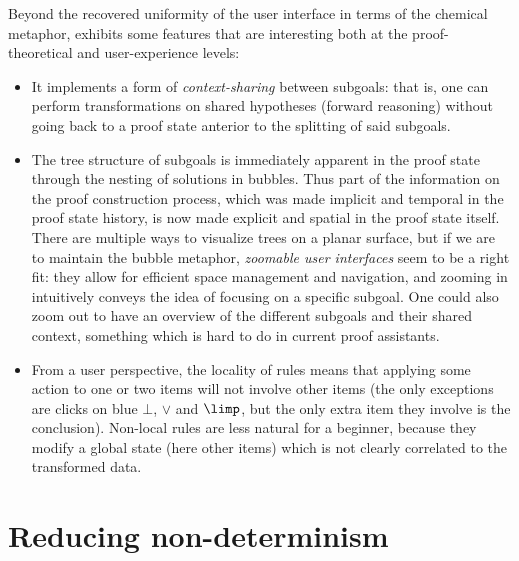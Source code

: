 Beyond the recovered uniformity of the user interface in terms of the chemical
metaphor,  exhibits some features that are interesting both at the
proof-theoretical and user-experience levels:
\begin{itemize}
  \item It implements a form of \emph{context-sharing} between subgoals: that
    is, one can perform transformations on shared hypotheses (forward reasoning)
    without going back to a proof state anterior to the splitting of said
    subgoals.
  \item The tree structure of subgoals is immediately apparent in the proof
    state through the nesting of solutions in bubbles. Thus part of the
    information on the proof construction process, which was made implicit and
    temporal in the proof state history, is now made explicit and spatial in the
    proof state itself. There are multiple ways to visualize trees on a planar
    surface, but if we are to maintain the bubble metaphor, \emph{zoomable user
    interfaces} seem to be a right fit: they allow for efficient space
    management and navigation, and zooming in intuitively conveys the idea of
    focusing on a specific subgoal. One could also zoom out to have an overview
    of the different subgoals and their shared context, something which is hard
    to do in current proof assistants.
  \item From a user perspective, the locality of rules means that applying some
    action to one or two items will not involve other items (the only exceptions
    are clicks on blue $\bot$, $\lor$ and ${\limp}$, but the only extra item
    they involve is the conclusion). Non-local rules are less natural for a
    beginner, because they modify a global state (here other items) which is not
    clearly correlated to the transformed data.
\end{itemize}

\section{Reducing non-determinism}

